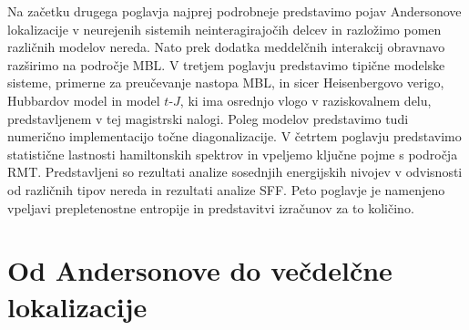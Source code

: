   Na začetku drugega poglavja najprej podrobneje predstavimo pojav Andersonove lokalizacije v neurejenih sistemih neinteragirajočih delcev in razložimo pomen različnih modelov nereda. Nato prek dodatka meddelčnih interakcij obravnavo razširimo na področje MBL. V tretjem poglavju predstavimo tipične modelske sisteme, primerne za preučevanje nastopa MBL, in sicer Heisenbergovo verigo, Hubbardov model in model $t$-$J$, ki ima osrednjo vlogo v raziskovalnem delu, predstavljenem v tej magistrski nalogi. Poleg modelov predstavimo tudi numerično implementacijo točne diagonalizacije. V četrtem poglavju predstavimo statistične lastnosti hamiltonskih spektrov in vpeljemo ključne pojme s področja RMT. Predstavljeni so rezultati analize sosednjih energijskih nivojev v odvisnosti od različnih tipov nereda in rezultati analize SFF. Peto poglavje je namenjeno vpeljavi prepletenostne entropije in predstavitvi izračunov za to količino. 





%
\chapter{Od Andersonove do večdelčne lokalizacije}
